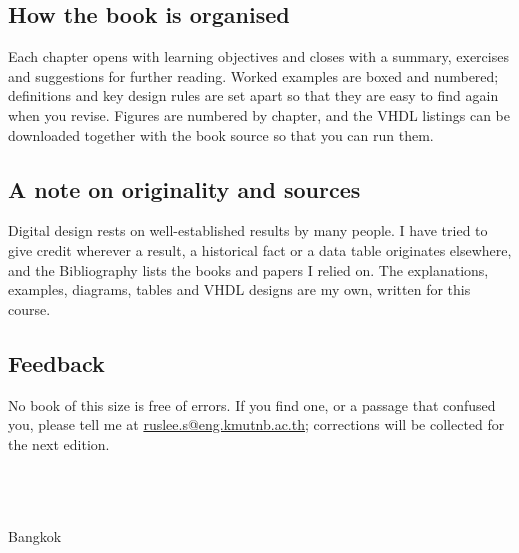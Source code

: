 \subsection*{How the book is organised}
Each chapter opens with learning objectives and closes with a summary, exercises and suggestions for further reading.
Worked examples are boxed and numbered; definitions and key design rules are set apart so that they are easy to find again when you revise.
Figures are numbered by chapter, and the VHDL listings can be downloaded together with the book source so that you can run them.

\subsection*{A note on originality and sources}
Digital design rests on well-established results by many people. I have tried to give credit wherever a result, a
historical fact or a data table originates elsewhere, and the Bibliography lists the books and papers I relied on. The explanations,
examples, diagrams, tables and VHDL designs are my own, written for this course.

\subsection*{Feedback}
No book of this size is free of errors. If you find one, or a passage that confused you, please tell me at
\href{mailto:ruslee.s@eng.kmutnb.ac.th}{ruslee.s@eng.kmutnb.ac.th}; corrections will be collected for the next edition.

\bigskip
\begin{flushright}
\AuthorFull\\
\AuthorDept\\
\AuthorUni\\
Bangkok
\end{flushright}
\clearpage
